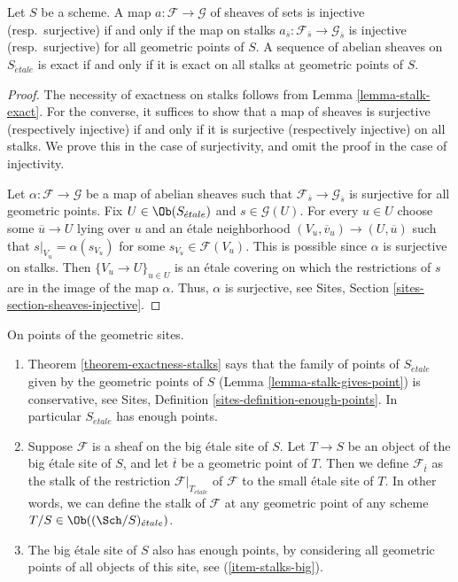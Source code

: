 \begin{theorem}
\label{theorem-exactness-stalks}
Let $S$ be a scheme.
A map $a : \mathcal{F} \to \mathcal{G}$ of sheaves of sets is injective
(resp.\ surjective) if and only if the map on stalks
$a_{\overline{s}} : \mathcal{F}_{\overline{s}} \to \mathcal{G}_{\overline{s}}$
is injective (resp.\ surjective) for all geometric points of $S$.
A sequence of abelian sheaves on $S_{\acute{e}tale}$ is exact
if and only if it is exact on all stalks at geometric points of $S$.
\end{theorem}

\begin{proof}
The necessity of exactness on stalks follows from
Lemma \ref{lemma-stalk-exact}.
For the converse, it suffices to show that a map of sheaves is surjective
(respectively injective) if and only if it is surjective (respectively
injective) on all stalks. We prove this in the case of surjectivity, and omit
the proof in the case of injectivity.

\medskip\noindent
Let $\alpha : \mathcal{F} \to \mathcal{G}$ be a map of abelian sheaves such
that $\mathcal{F}_{\overline{s}} \to \mathcal{G}_{\overline{s}}$
is surjective for all geometric points. Fix
$U \in \Ob(S_{\acute{e}tale})$
and $s \in \mathcal{G}(U)$. For every $u \in U$ choose some
$\overline{u} \to U$ lying over $u$ and an \'etale neighborhood
$(V_u , \overline{v}_u) \to (U, \overline{u})$ such that
$s|_{V_u} = \alpha(s_{V_u})$ for some
$s_{V_u} \in \mathcal{F}(V_u)$.
This is possible since $\alpha$ is surjective on
stalks. Then $\{V_u \to U\}_{u \in U}$
is an \'etale covering on which the restrictions of $s$
are in the image of the map $\alpha$.
Thus, $\alpha$ is surjective, see
Sites, Section \ref{sites-section-sheaves-injective}.
\end{proof}

\begin{remarks}
\label{remarks-enough-points}
On points of the geometric sites.
\begin{enumerate}
\item Theorem \ref{theorem-exactness-stalks} says that the family of points
of $S_{\acute{e}tale}$ given by the geometric points of $S$
(Lemma \ref{lemma-stalk-gives-point}) is conservative, see
Sites, Definition \ref{sites-definition-enough-points}.
In particular $S_{\acute{e}tale}$ has enough points.
\item Suppose $\mathcal{F}$ is a sheaf on the big \'etale site
\label{item-stalks-big}
of $S$. Let $T \to S$ be an object of the big \'etale site of $S$,
and let $\overline{t}$ be a geometric point of $T$. Then we define
$\mathcal{F}_{\overline{t}}$ as the stalk
of the restriction $\mathcal{F}|_{T_{\acute{e}tale}}$ of $\mathcal{F}$
to the small \'etale site of $T$. In other words, we can define
the stalk of $\mathcal{F}$ at any geometric point of any
scheme $T/S \in \Ob((\Sch/S)_{\acute{e}tale})$.
\item The big \'etale site of $S$ also has enough points, by
considering all geometric points of all objects of this site, see
(\ref{item-stalks-big}).
\end{enumerate}
\end{remarks}

